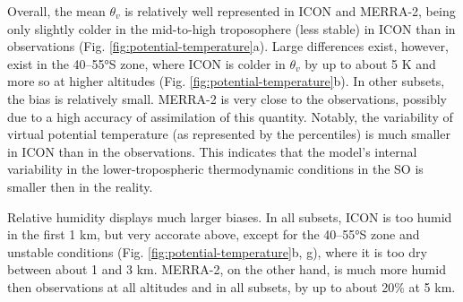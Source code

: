\documentclass[12pt,a4paper]{article}
\begin{document}
Overall, the mean $\theta_v$ is relatively well represented in ICON and MERRA-2,
being only slightly colder in the mid-to-high troposophere (less stable) in ICON
than in observations (Fig. \ref{fig:potential-temperature}a). Large differences exist, however, exist in the 40--55°S
zone, where ICON is colder in $\theta_v$ by up to about 5 K and more so
at higher altitudes (Fig. \ref{fig:potential-temperature}b). In other subsets, the bias is relatively small. MERRA-2
is very close to the observations, possibly due to a high accuracy of
assimilation of this quantity. Notably, the variability of virtual potential
temperature (as represented by the percentiles) is much smaller in ICON than in
the observations. This indicates that the model's internal variability in the
lower-tropospheric thermodynamic conditions in the SO is smaller then in the
reality.

Relative humidity displays much larger biases. In all subsets, ICON is too
humid in the first 1 km, but very accorate above, except for the 40--55°S zone
and unstable conditions (Fig. \ref{fig:potential-temperature}b, g),  where it
is too dry between about 1 and 3 km. MERRA-2, on the other hand, is much more
humid then observations at all altitudes and in all subsets, by up to about
20\% at 5 km.
\end{document}
